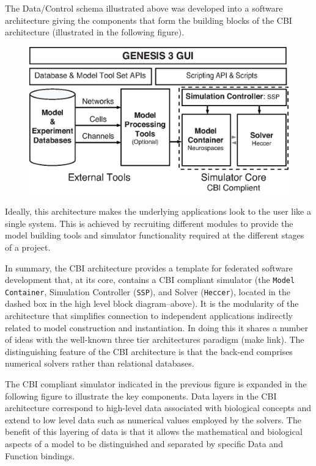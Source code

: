 \documentclass[12pt]{article}
\begin{document}
The Data/Control schema illustrated above was developed into a software architecture giving the components that form the building blocks of the CBI architecture (illustrated in the following figure).  
\begin{figure}[h]
  \centering
 \includegraphics[scale=0.75]{figures/G3-Architecture-Overview-1.eps}
  \label{fig:architecture1}
\end{figure}
Ideally, this architecture makes the underlying applications look to the user like a single system. This is achieved by recruiting different modules to provide the model building tools and simulator functionality required at the different stages of a project.

In summary, the CBI architecture provides a template for federated software development that, at its core, contains a CBI compliant simulator (the {\tt Model\,Container}, Simulation Controller ({\tt SSP}), and Solver ({\tt Heccer}), located in the dashed box in the high level block diagram--above). It is the modularity of the architecture that simplifies connection to independent applications indirectly related to model construction and instantiation. In doing this it shares a number of ideas with the well-known three tier architectures paradigm (make link). The distinguishing feature of the CBI architecture is that the back-end comprises numerical solvers rather than relational databases.

The CBI compliant simulator indicated in the previous figure is expanded in the following figure to illustrate the key components. Data layers in the CBI architecture correspond to high-level data associated with biological concepts and extend to low level data such as numerical values employed by the solvers. The benefit of this layering of data is that it allows the mathematical and biological aspects of a model to be distinguished and separated by specific Data and Function bindings.
\end{document}
